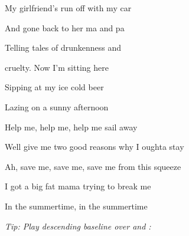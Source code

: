\begin{song}
\bigskip

My girlfriend's run off with my car \par
And gone back to her ma and pa \par
{}Telling tales of drunkenness and \par
{}cruelty. Now I'm sitting here \par
{}Sipping at my ice cold beer \par
{}Lazing on a sunny afternoon \par

\bigskip

Help me, help me, help me sail away \par
Well give me two good reasons why I oughta stay  \par

\bigskip

\Chorus

\bigskip

Ah, save me, save me, save me from this squeeze \par
I got a big fat mama trying to break me  \par

\bigskip

\Chorus

\bigskip

In the summertime, in the summertime \par
{} \par


\vfill

{\smaller\it
Tip: Play descending baseline over  and :
}

\bigskip

\normalsize


\end{song}
